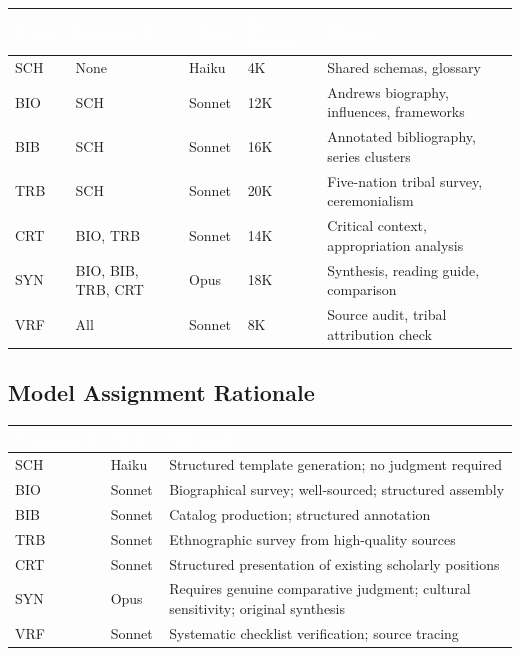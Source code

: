 \documentclass[11pt,letterpaper]{article}
\newcommand{\tableheader}[1]{\textbf{\sffamily\textcolor{white}{#1}}}
\begin{document}
\begin{center}
\begin{tabularx}{\textwidth}{L{2cm}L{2.5cm}C{1.5cm}C{2cm}X}
\toprule
{}
\tableheader{Comp.} & \tableheader{Depends On} & \tableheader{Model} & \tableheader{Est. Tokens} & \tableheader{Output} \\
\midrule
SCH & None & Haiku & 4K & Shared schemas, glossary \\
BIO & SCH & Sonnet & 12K & Andrews biography, influences, frameworks \\
BIB & SCH & Sonnet & 16K & Annotated bibliography, series clusters \\
TRB & SCH & Sonnet & 20K & Five-nation tribal survey, ceremonialism \\
CRT & BIO, TRB & Sonnet & 14K & Critical context, appropriation analysis \\
SYN & BIO, BIB, TRB, CRT & Opus & 18K & Synthesis, reading guide, comparison \\
VRF & All & Sonnet & 8K & Source audit, tribal attribution check \\
\bottomrule
\end{tabularx}
\end{center}

\subsection{Model Assignment Rationale}

\begin{center}
\begin{tabularx}{\textwidth}{L{2cm}C{1.5cm}X}
\toprule
{}
\tableheader{Component} & \tableheader{Model} & \tableheader{Rationale} \\
\midrule
SCH & Haiku & Structured template generation; no judgment required \\
BIO & Sonnet & Biographical survey; well-sourced; structured assembly \\
BIB & Sonnet & Catalog production; structured annotation \\
TRB & Sonnet & Ethnographic survey from high-quality sources \\
CRT & Sonnet & Structured presentation of existing scholarly positions \\
SYN & Opus & Requires genuine comparative judgment; cultural sensitivity; original synthesis \\
VRF & Sonnet & Systematic checklist verification; source tracing \\
\bottomrule
\end{tabularx}
\end{center}
\end{document}
